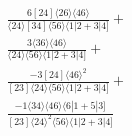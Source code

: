 \documentclass[varwidth, border=5pt]{standalone}
\begin{document}
\begin{my}
$\begin{gathered}
\scriptscriptstyle\frac{6[24]⟨26⟩⟨46⟩}{⟨24⟩[34]⟨56⟩⟨1|2+3|4]}+\\
\scriptscriptstyle\frac{3⟨36⟩⟨46⟩}{⟨24⟩⟨56⟩⟨1|2+3|4]}+\\
\scriptscriptstyle\frac{-3[24]⟨46⟩^2}{[23]⟨24⟩⟨56⟩⟨1|2+3|4]}+\\
\scriptscriptstyle\frac{-1⟨34⟩⟨46⟩⟨6|1+5|3]}{[23]⟨24⟩^2⟨56⟩⟨1|2+3|4]}\phantom{+}
\end{gathered}$
\end{my}
\end{document}
